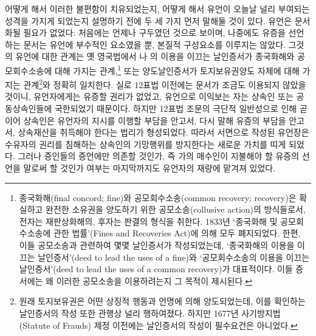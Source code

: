 어떻게 해서 이러한 불편함이 치유되었는지,
어떻게 해서 유언이 오늘날 널리 부여되는 성격을 가지게 되었는지
설명하기 전에
두 세 가지 먼저 말해둘 것이 있다.
유언은 문서화될 필요가 없었다:
처음에는 언제나 구두였던 것으로 보이며,
나중에도 유증을 선언하는 문서는 유언에 부수적인 요소였을 뿐,
본질적 구성요소를 이루지는 않았다.
\label{finerecovery}%
그것의 유언에 대한 관계는
옛 영국법에서
나
의
이용을 이끄는 날인증서가
종국화해와
공모회수소송에
대해 가지는 관계,\footnote{%
  종국화해(final concord; fine)와 공모회수소송(common recovery; recovery)은
  확실하고 완전한 소유권을 양도하기 위한
  공모소송(collusive action)의 방식들로서,
  전자는 재판상화해의, 후자는 판결의 형식을 취한다.
  1833년 `종국화해 및 공모회수소송에 관한 법률'(Fines and Recoveries Act)에
  의해 모두 폐지되었다.
  한편, 이들 공모소송과 관련하여 몇몇 날인증서가 작성되었는데,
  `종국화해의 이용을 이끄는 날인증서'(deed to lead the uses of a fine)와
  `공모회수소송의 이용을 이끄는
  날인증서'(deed to lead the uses of a common recovery)가 대표적이다.
  이들 증서에는 왜 이러한 공모소송을 이용하려는지 그 목적이 제시된다.
}
또는
양도날인증서가
토지보유권양도 자체에 대해 가지는 관계\footnote{%
  원래 토지보유권은 어떤 상징적 행동과 언명에 의해 양도되었는데,
  이를 확인하는 날인증서의 작성 또한 관행상 널리 행하여졌다.
  하지만 1677년 사기방지법(Statute of Frauds) 제정 이전에는
  날인증서의 작성이 필수요건은 아니었다.
}와
정확히 일치한다.
실로 12표법 이전에는 문서가 조금도 이용되지 않았을 것이니,
유언자에게는 유증할 권리가 없었고,
유언으로 이익보는 자는 상속인 또는 공동상속인들에 국한되었기 때문이다.
하지만 12표법 조문의 극단적 일반성으로 인해
곧이어
상속인은 유언자의 지시를 이행할 부담을 안고서,
다시 말해 유증의 부담을 안고서,
상속재산을 취득해야 한다는 법리가
형성되었다.
따라서 서면으로 작성된 유언장은
수유자의 권리를 침해하는 상속인의 기망행위를
방지한다는 새로운 가치를 띠게 되었다.
그러나
증인들의 증언에만 의존할 것인가, 즉
가의 매수인이 지불해야 할 유증의 선언을 말로써 할 것인가 여부는
마지막까지도 유언자의 재량에 맡겨져 있었다.

